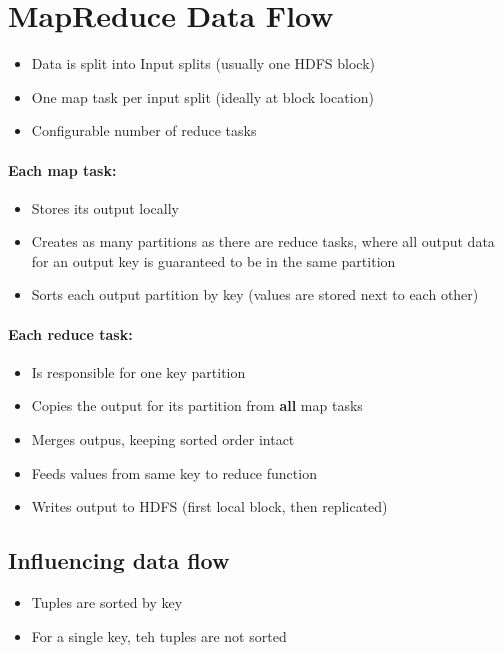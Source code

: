 \documentclass[10pt,a4paper]{scrreprt}
\begin{document}
\section{MapReduce Data Flow}
\begin{itemize}
	\item Data is split into Input splits (usually one HDFS block)
	\item One map task per input split (ideally at block location)
	\item Configurable number of reduce tasks
\end{itemize}

\paragraph{Each map task:}
\begin{itemize}
	\item Stores its output locally
	\item Creates as many partitions as there are reduce tasks, where all output data for an output key is  guaranteed to be in the same partition
	\item Sorts each output partition by key (values are stored next to each other)
\end{itemize}

\paragraph{Each reduce task:}
\begin{itemize}
	\item Is responsible for one key partition
	\item Copies the output for its partition from \textbf{all} map tasks
	\item Merges outpus, keeping sorted order intact
	\item Feeds values from same key to reduce function
	\item Writes output to HDFS (first local block, then replicated)
\end{itemize}

\subsection{Influencing data flow}
\begin{itemize}
	\item Tuples are sorted by key
	\item For a single key, teh tuples are not sorted
\end{itemize}
\end{document}
